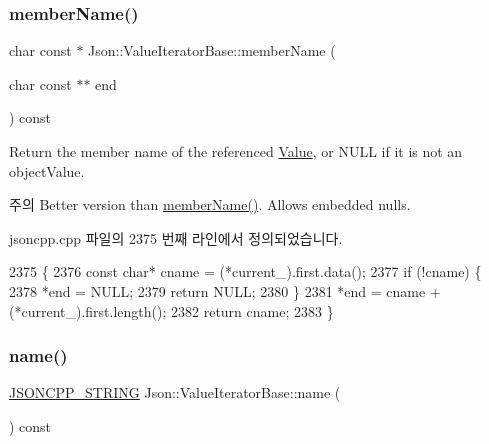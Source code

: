 \subsubsection{\texorpdfstring{member\+Name()}{memberName()}\hspace{0.1cm}{\footnotesize\ttfamily [2/2]}}
{\footnotesize\ttfamily char const  $\ast$ Json\+::\+Value\+Iterator\+Base\+::member\+Name (\begin{DoxyParamCaption}\item[{char const $\ast$$\ast$}]{end }\end{DoxyParamCaption}) const\hspace{0.3cm}{\ttfamily [inherited]}}

Return the member name of the referenced \hyperlink{class_json_1_1_value}{Value}, or N\+U\+LL if it is not an object\+Value. \begin{DoxyNote}{주의}
Better version than \hyperlink{class_json_1_1_value_iterator_base_a54765da6759fd3f1edcbfbaf308ec263}{member\+Name()}. Allows embedded nulls. 
\end{DoxyNote}


jsoncpp.\+cpp 파일의 2375 번째 라인에서 정의되었습니다.


\begin{DoxyCode}
2375                                                                 \{
2376   \textcolor{keyword}{const} \textcolor{keywordtype}{char}* cname = (*current\_).first.data();
2377   \textcolor{keywordflow}{if} (!cname) \{
2378     *end = NULL;
2379     \textcolor{keywordflow}{return} NULL;
2380   \}
2381   *end = cname + (*current\_).first.length();
2382   \textcolor{keywordflow}{return} cname;
2383 \}
\end{DoxyCode}
\mbox{\label{class_json_1_1_value_iterator_base_a522989403c976fdbb94da846b99418db}} 
\subsubsection{\texorpdfstring{name()}{name()}}
{\footnotesize\ttfamily \hyperlink{json_8h_a1e723f95759de062585bc4a8fd3fa4be}{J\+S\+O\+N\+C\+P\+P\+\_\+\+S\+T\+R\+I\+NG} Json\+::\+Value\+Iterator\+Base\+::name (\begin{DoxyParamCaption}{ }\end{DoxyParamCaption}) const\hspace{0.3cm}{\ttfamily [inherited]}}

